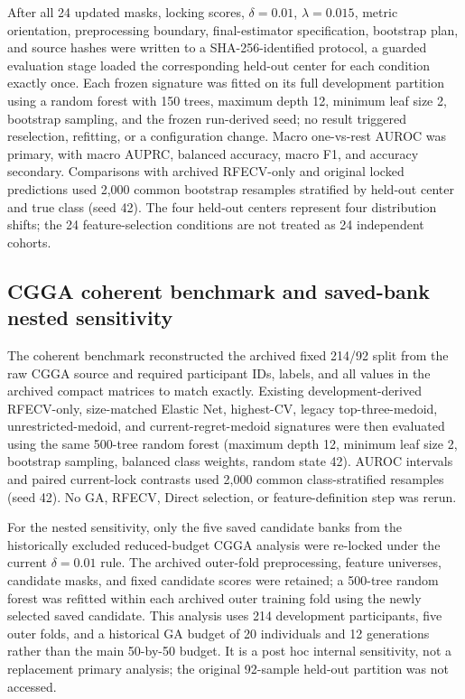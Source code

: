 After all 24 updated masks, locking scores, \(\delta=0.01\), \(\lambda=0.015\), metric orientation, preprocessing boundary, final-estimator specification, bootstrap plan, and source hashes were written to a SHA-256-identified protocol, a guarded evaluation stage loaded the corresponding held-out center for each condition exactly once. Each frozen signature was fitted on its full development partition using a random forest with 150 trees, maximum depth 12, minimum leaf size 2, bootstrap sampling, and the frozen run-derived seed; no result triggered reselection, refitting, or a configuration change. Macro one-vs-rest AUROC was primary, with macro AUPRC, balanced accuracy, macro F1, and accuracy secondary. Comparisons with archived RFECV-only and original locked predictions used 2,000 common bootstrap resamples stratified by held-out center and true class (seed 42). The four held-out centers represent four distribution shifts; the 24 feature-selection conditions are not treated as 24 independent cohorts.

\subsection{CGGA coherent benchmark and saved-bank nested sensitivity}

The coherent benchmark reconstructed the archived fixed 214/92 split from the raw CGGA source and required participant IDs, labels, and all values in the archived compact matrices to match exactly. Existing development-derived RFECV-only, size-matched Elastic Net, highest-CV, legacy top-three-medoid, unrestricted-medoid, and current-regret-medoid signatures were then evaluated using the same 500-tree random forest (maximum depth 12, minimum leaf size 2, bootstrap sampling, balanced class weights, random state 42). AUROC intervals and paired current-lock contrasts used 2,000 common class-stratified resamples (seed 42). No GA, RFECV, Direct selection, or feature-definition step was rerun.

For the nested sensitivity, only the five saved candidate banks from the historically excluded reduced-budget CGGA analysis were re-locked under the current \(\delta=0.01\) rule. The archived outer-fold preprocessing, feature universes, candidate masks, and fixed candidate scores were retained; a 500-tree random forest was refitted within each archived outer training fold using the newly selected saved candidate. This analysis uses 214 development participants, five outer folds, and a historical GA budget of 20 individuals and 12 generations rather than the main 50-by-50 budget. It is a post hoc internal sensitivity, not a replacement primary analysis; the original 92-sample held-out partition was not accessed.

